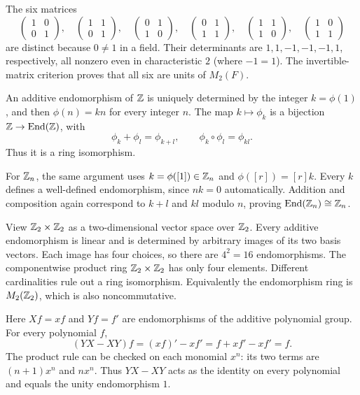 The six matrices
\[
\begin{pmatrix}1&0\\0&1\end{pmatrix},\quad
\begin{pmatrix}1&1\\0&1\end{pmatrix},\quad
\begin{pmatrix}0&1\\1&0\end{pmatrix},\quad
\begin{pmatrix}0&1\\1&1\end{pmatrix},\quad
\begin{pmatrix}1&1\\1&0\end{pmatrix},\quad
\begin{pmatrix}1&0\\1&1\end{pmatrix}
\]
are distinct because $0\ne1$ in a field. Their determinants are $1,1,-1,-1,-1,1$, respectively, all nonzero even in characteristic $2$ (where $-1=1$). The invertible-matrix criterion proves that all six are units of $M_2(F)$.

An additive endomorphism of $\mathbb{Z}$ is uniquely determined by the integer $k=\phi(1)$, and then $\phi(n)=kn$ for every integer $n$. The map $k\mapsto\phi_k$ is a bijection $\mathbb{Z}\to\operatorname{End}(\mathbb{Z})$, with
\[\phi_k+\phi_l=\phi_{k+l},\qquad\phi_k\circ\phi_l=\phi_{kl}.
\]
Thus it is a ring isomorphism.\par
For $\mathbb{Z}_n$, the same argument uses $k=\phi([1])\in\mathbb{Z}_n$ and $\phi([r])=[r]k$. Every $k$ defines a well-defined endomorphism, since $nk=0$ automatically. Addition and composition again correspond to $k+l$ and $kl$ modulo $n$, proving $\operatorname{End}(\mathbb{Z}_n)\cong\mathbb{Z}_n$.

View $\mathbb{Z}_2\times\mathbb{Z}_2$ as a two-dimensional vector space over $\mathbb{Z}_2$. Every additive endomorphism is linear and is determined by arbitrary images of its two basis vectors. Each image has four choices, so there are $4^2=16$ endomorphisms. The componentwise product ring $\mathbb{Z}_2\times\mathbb{Z}_2$ has only four elements. Different cardinalities rule out a ring isomorphism. Equivalently the endomorphism ring is $M_2(\mathbb{Z}_2)$, which is also noncommutative.

Here $Xf=xf$ and $Yf=f'$ are endomorphisms of the additive polynomial group. For every polynomial $f$,
\[(YX-XY)f=(xf)'-xf'=f+xf'-xf'=f.
\]
The product rule can be checked on each monomial $x^n$: its two terms are $(n+1)x^n$ and $nx^n$. Thus $YX-XY$ acts as the identity on every polynomial and equals the unity endomorphism $\boxed1$.

